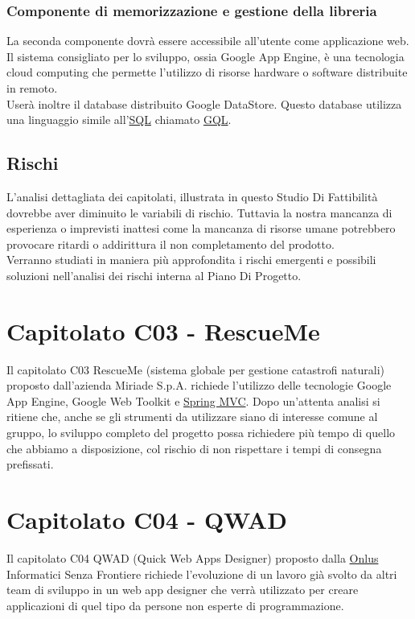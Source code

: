 \subsection{Componente di memorizzazione e gestione della libreria}
La seconda componente dovr\`a essere accessibile all'utente come
applicazione web. Il sistema consigliato per lo sviluppo, ossia Google App Engine, 
\`e una tecnologia cloud computing che permette l'utilizzo di risorse hardware o
 software distribuite in remoto.\\
 User\`a inoltre il database distribuito
 Google DataStore. Questo database utilizza una linguaggio simile
 all'\underline{SQL} chiamato \underline{GQL}.

\section{Rischi}
L'analisi dettagliata dei capitolati, illustrata in questo Studio Di
Fattibilit\`a dovrebbe aver diminuito le variabili di rischio. Tuttavia la
nostra mancanza di esperienza o imprevisti inattesi come la mancanza di
risorse umane potrebbero provocare ritardi o addirittura il non completamento
del prodotto.\\

Verranno studiati in maniera pi\`u approfondita i rischi emergenti e possibili
soluzioni nell'analisi dei rischi interna al Piano Di Progetto.

\chapter{Capitolato C03 - RescueMe}
\thispagestyle{fancy}
Il capitolato C03 RescueMe (sistema globale per gestione catastrofi naturali)
proposto dall'azienda Miriade S.p.A. richiede l'utilizzo delle tecnologie
Google App Engine, Google Web Toolkit e \underline{Spring MVC}. Dopo un'attenta
analisi si ritiene che, anche se gli strumenti da utilizzare siano di
interesse comune al gruppo, lo sviluppo completo del progetto possa richiedere
pi\`u tempo di quello che abbiamo a disposizione, col rischio di non rispettare
i tempi di consegna prefissati.

\chapter{Capitolato C04 - QWAD}
\thispagestyle{fancy}
Il capitolato C04 QWAD (Quick Web Apps Designer) proposto dalla \underline{Onlus}
Informatici Senza Frontiere richiede l'evoluzione di un lavoro gi\`a
svolto da altri team di sviluppo in un web app designer che
verr\`a utilizzato per creare applicazioni di quel tipo da persone non esperte
di programmazione.\\

